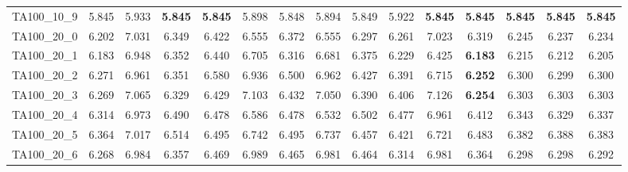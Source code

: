 \begin{tabular}{cc||ccccccccccccc}
TA100\_10\_9       & 5.845            & 5.933            & {\bf 5.845}      & {\bf 5.845}      & 5.898            & 5.848            & 5.894            & 5.849            & 5.922            & {\bf 5.845}      & {\bf 5.845}      & {\bf 5.845}      & {\bf 5.845}      & {\bf 5.845}     \\ 
TA100\_20\_0       & 6.202            & 7.031            & 6.349            & 6.422            & 6.555            & 6.372            & 6.555            & 6.297            & 6.261            & 7.023            & 6.319            & 6.245            & 6.237            & 6.234           \\ 
TA100\_20\_1       & 6.183            & 6.948            & 6.352            & 6.440            & 6.705            & 6.316            & 6.681            & 6.375            & 6.229            & 6.425            & {\bf 6.183}      & 6.215            & 6.212            & 6.205           \\ 
TA100\_20\_2       & 6.271            & 6.961            & 6.351            & 6.580            & 6.936            & 6.500            & 6.962            & 6.427            & 6.391            & 6.715            & {\bf 6.252}      & 6.300            & 6.299            & 6.300           \\ 
TA100\_20\_3       & 6.269            & 7.065            & 6.329            & 6.429            & 7.103            & 6.432            & 7.050            & 6.390            & 6.406            & 7.126            & {\bf 6.254}      & 6.303            & 6.303            & 6.303           \\ 
TA100\_20\_4       & 6.314            & 6.973            & 6.490            & 6.478            & 6.586            & 6.478            & 6.532            & 6.502            & 6.477            & 6.961            & 6.412            & 6.343            & 6.329            & 6.337           \\ 
TA100\_20\_5       & 6.364            & 7.017            & 6.514            & 6.495            & 6.742            & 6.495            & 6.737            & 6.457            & 6.421            & 6.721            & 6.483            & 6.382            & 6.388            & 6.383           \\ 
TA100\_20\_6       & 6.268            & 6.984            & 6.357            & 6.469            & 6.989            & 6.465            & 6.981            & 6.464            & 6.314            & 6.981            & 6.364            & 6.298            & 6.298            & 6.292           \\ 

\end{tabular}
